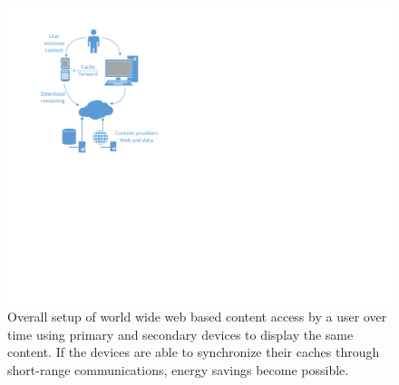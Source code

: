 \documentclass[letterpaper,conference]{IEEEtran}
\begin{document}
\begin{figure}
	\centering
	\includegraphics[width=.9\linewidth]{Drawing1}
	\caption{Overall setup of world wide web based content access by a user over time using primary and secondary devices to display the same content. If the devices are able to synchronize their caches through short-range communications, energy savings become possible.}
	\label{fig:setup}
\end{figure}
\end{document}
